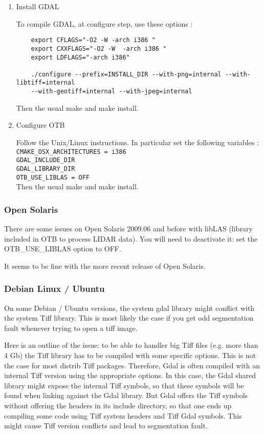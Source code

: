 \begin{enumerate}

\item Install GDAL

	To compile GDAL, at configure step, use these options :
\begin{verbatim}
	export CFLAGS="-O2 -W -arch i386 "
	export CXXFLAGS="-O2 -W  -arch i386 "
	export LDFLAGS="-arch i386"

	./configure --prefix=INSTALL_DIR --with-png=internal --with-libtiff=internal
	--with-geotiff=internal --with-jpeg=internal
\end{verbatim}

	Then the usual make and make install.


\item Configure OTB

        Follow the Unix/Linux instructions. In particular set the following variables :
        \texttt{CMAKE\_OSX\_ARCHITECTURES = i386}\\
        \texttt{GDAL\_INCLUDE\_DIR}\\
        \texttt{GDAL\_LIBRARY\_DIR}\\
        \texttt{OTB\_USE\_LIBLAS = OFF}\\

        Then the usual make and make install.

\end{enumerate}

\subsubsection{Open Solaris}
There are some issues on Open Solaris 2009.06 and before with libLAS (library included
in OTB to process LIDAR data). You will need to deactivate it: set the
OTB\_USE\_LIBLAS option to OFF.

It seems to be fine with the more recent release of Open Solaris.

\subsubsection{Debian Linux / Ubuntu}

On some Debian / Ubuntu versions, the system gdal library might conflict with the system Tiff library. This is most likely the case if you get odd segmentation fault whenever trying to open a tiff image.

Here is an outline of the issue: to be able to handler big Tiff files (e.g. more than 4 Gb) the Tiff library has to be compiled with some specific options. This is not the case for most distrib Tiff packages. Therefore, Gdal is often compiled with an internal Tiff version using the appropriate options. In this case, the Gdal shared library might expose the internal Tiff symbols, so that these symbols will be found when linking against the Gdal library. But Gdal offers the Tiff symbols without offering the headers in its include directory, so that one ends up compiling some code using Tiff system headers and Tiff Gdal symbols. This might cause Tiff version conflicts and lead to segmentation fault.

